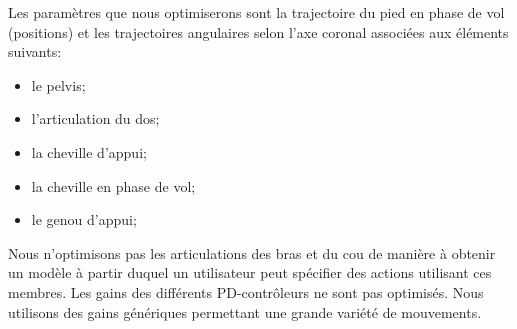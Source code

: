 \documentclass[runningheads,a4paper]{llncs}
\begin{document}
Les paramètres que nous optimiserons sont la trajectoire du pied en phase de vol (positions) et les trajectoires angulaires selon l'axe coronal associées aux éléments suivants:
\begin{itemize}
\item{le pelvis;}
\item{l'articulation du dos;}
\item{la cheville d'appui;}
\item{la cheville en phase de vol;}
\item{le genou d'appui;}
\end{itemize}

Nous n'optimisons pas les articulations des bras et du cou de manière à obtenir un modèle à partir duquel un utilisateur peut spécifier des actions utilisant ces membres. Les gains des différents PD-contrôleurs ne sont pas optimisés. Nous utilisons des gains génériques permettant une grande variété de mouvements. 

%
\end{document}
